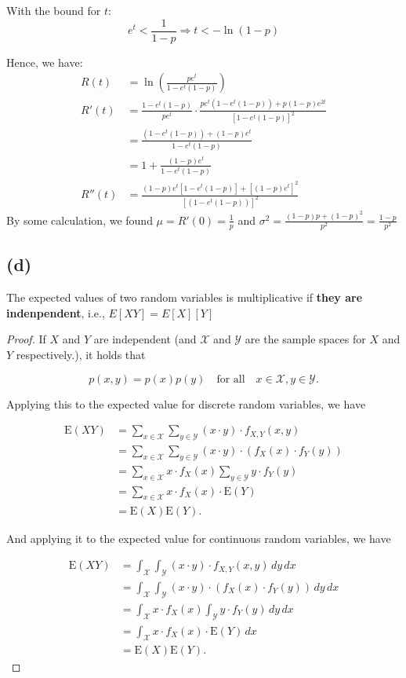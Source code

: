 With the bound for $t$:
$$e^t<\frac{1}{1-p}\Rightarrow t<-\ln{(1-p)}$$

Hence, we have:
\begin{align*}
    R(t)&=\ln{(\frac{pe^t}{1-e^t(1-p)})} \\
    R'(t)&=\frac{1-e^t(1-p)}{pe^t}\cdot \frac{pe^t(1-e^t(1-p))+p(1-p)e^{2t}}{[1-e^t(1-p)]^2} \\
    &=\frac{(1-e^t(1-p))+(1-p)e^t}{1-e^t(1-p)} \\
    &=1+\frac{(1-p)e^t}{1-e^t(1-p)} \\
    R''(t)&=\frac{(1-p)e^t[1-e^t(1-p)]+[(1-p)e^t]^2}{[(1-e^t(1-p))]^2}
\end{align*}
By some calculation, we found $\mu=R'(0)=\frac{1}{p}$ and $\sigma^2=\frac{(1-p)p+(1-p)^2}{p^2}=\frac{1-p}{p^2}$
\subsection*{(d)}
\noindent\makebox[\linewidth]{\rule{\linewidth}{0.4pt}}
\begin{theorem}
The expected values of two random variables is multiplicative if \textbf{they are indenpendent}, i.e., $E[XY]=E[X][Y]$
\end{theorem}
\begin{proof}
If $X$ and $Y$ are independent (and $\mathcal{X}$ and $\mathcal{Y}$ are the sample spaces for $X$ and $Y$ respectively.), it holds that

\begin{equation}
p(x, y) = p(x)p(y) \quad \text{for all} \quad x \in \mathcal{X}, y \in \mathcal{Y} .
\end{equation}

Applying this to the expected value for discrete random variables, we have

\begin{align*}
\text{E}(XY) &= \sum_{x \in \mathcal{X}} \sum_{y \in \mathcal{Y}} (x \cdot y) \cdot f_{X,Y}(x, y) \\ 
&= \sum_{x \in \mathcal{X}} \sum_{y \in \mathcal{Y}} (x \cdot y) \cdot (f_X(x) \cdot f_Y(y)) \\ 
&= \sum_{x \in \mathcal{X}} x \cdot f_X(x) \sum_{y \in \mathcal{Y}} y \cdot f_Y(y) \\ 
&= \sum_{x \in \mathcal{X}} x \cdot f_X(x) \cdot \text{E}(Y) \\ 
&= \text{E}(X)\text{E}(Y) . 
\end{align*}

And applying it to the expected value for continuous random variables, we have

\begin{align*} 
\text{E}(XY) &= \int_{\mathcal{X}} \int_{\mathcal{Y}} (x \cdot y) \cdot f_{X,Y}(x, y) \,dy \,dx \\ 
&= \int_{\mathcal{X}} \int_{\mathcal{Y}} (x \cdot y) \cdot (f_X(x) \cdot f_Y(y)) \,dy \,dx \\ 
&= \int_{\mathcal{X}} x \cdot f_X(x) \int_{\mathcal{Y}} y \cdot f_Y(y) \,dy \,dx \\ 
&= \int_{\mathcal{X}} x \cdot f_X(x) \cdot \text{E}(Y) \,dx \\ 
&= \text{E}(X)\text{E}(Y) . 
\end{align*}
\end{proof}

